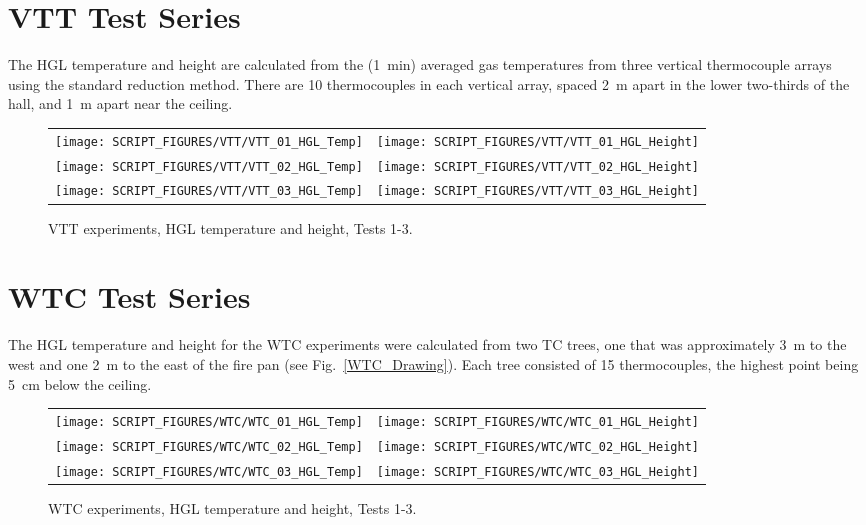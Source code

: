 \clearpage

\section{VTT Test Series}

The HGL temperature and height are calculated from the (1~min) averaged gas temperatures from three vertical thermocouple arrays using the standard reduction method. There are 10 thermocouples in each vertical array, spaced 2~m apart in the lower two-thirds of the hall, and 1~m apart near the ceiling.

\begin{figure}[h!]
\begin{tabular*}{\textwidth}{l@{\extracolsep{\fill}}r}
\texttt{[image: SCRIPT\_FIGURES/VTT/VTT\_01\_HGL\_Temp]} &
\texttt{[image: SCRIPT\_FIGURES/VTT/VTT\_01\_HGL\_Height]} \\
\texttt{[image: SCRIPT\_FIGURES/VTT/VTT\_02\_HGL\_Temp]} &
\texttt{[image: SCRIPT\_FIGURES/VTT/VTT\_02\_HGL\_Height]} \\
\texttt{[image: SCRIPT\_FIGURES/VTT/VTT\_03\_HGL\_Temp]} &
\texttt{[image: SCRIPT\_FIGURES/VTT/VTT\_03\_HGL\_Height]}
\end{tabular*}
\caption[VTT experiments, HGL temperature and height, Tests 1-3]
{VTT experiments, HGL temperature and height, Tests 1-3.}
\label{VTT_HGL}
\end{figure}



\clearpage

\section{WTC Test Series}

The HGL temperature and height for the WTC experiments were calculated from two TC trees, one that was approximately 3~m to the west and one
2~m to the east of the fire pan (see Fig.~\ref{WTC_Drawing}). Each tree consisted of 15 thermocouples, the highest point being 5~cm below the ceiling.

\begin{figure}[!h]
\begin{tabular*}{\textwidth}{l@{\extracolsep{\fill}}r}
\texttt{[image: SCRIPT\_FIGURES/WTC/WTC\_01\_HGL\_Temp]} &
\texttt{[image: SCRIPT\_FIGURES/WTC/WTC\_01\_HGL\_Height]} \\
\texttt{[image: SCRIPT\_FIGURES/WTC/WTC\_02\_HGL\_Temp]} &
\texttt{[image: SCRIPT\_FIGURES/WTC/WTC\_02\_HGL\_Height]} \\
\texttt{[image: SCRIPT\_FIGURES/WTC/WTC\_03\_HGL\_Temp]} &
\texttt{[image: SCRIPT\_FIGURES/WTC/WTC\_03\_HGL\_Height]}
\end{tabular*}
\caption[WTC experiments, HGL temperature and height, Tests 1-3]
{WTC experiments, HGL temperature and height, Tests 1-3.}
\label{WTC_HGL_1}
\end{figure}

